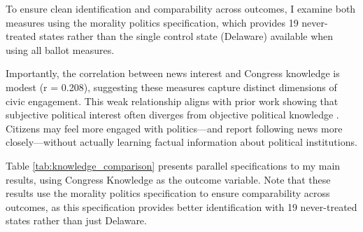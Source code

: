 \documentclass[12pt,letterpaper,oneside]{book}
\begin{document}
To ensure clean identification and comparability across outcomes, I examine both measures using the morality politics specification, which provides 19 never-treated states rather than the single control state (Delaware) available when using all ballot measures.

Importantly, the correlation between news interest and Congress knowledge is modest (r = 0.208), suggesting these measures capture distinct dimensions of civic engagement. This weak relationship aligns with prior work showing that subjective political interest often diverges from objective political knowledge \citep{prior2007post}. Citizens may feel more engaged with politics—and report following news more closely—without actually learning factual information about political institutions.

Table \ref{tab:knowledge_comparison} presents parallel specifications to my main results, using Congress Knowledge as the outcome variable. Note that these results use the morality politics specification to ensure comparability across outcomes, as this specification provides better identification with 19 never-treated states rather than just Delaware.
\end{document}
